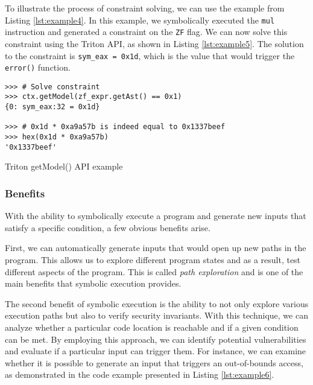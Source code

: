 To illustrate the process of constraint solving, we can use the example from Listing \ref{lst:example4}. In this example, we symbolically executed the \texttt{mul} instruction and generated a constraint on the \texttt{ZF} flag. We can now solve this constraint using the Triton API, as shown in Listing \ref{lst:example5}. The solution to the constraint is \texttt{sym\_eax = 0x1d}, which is the value that would trigger the \texttt{error()} function.

\begin{listing}[htp]
	\centering
	\begin{minipage}{.7\linewidth}
		\begin{verbatim}
>>> # Solve constraint
>>> ctx.getModel(zf_expr.getAst() == 0x1)
{0: sym_eax:32 = 0x1d}

>>> # 0x1d * 0xa9a57b is indeed equal to 0x1337beef
>>> hex(0x1d * 0xa9a57b)
'0x1337beef'
\end{verbatim}
	\end{minipage}
	\caption{Triton getModel() API example}
	\label{lst:example5}
\end{listing}

\subsubsection{Benefits}

With the ability to symbolically execute a program and generate new inputs that satisfy a specific condition, a few obvious benefits arise.

First, we can automatically generate inputs that would open up new paths in the program. This allows us to explore different program states and as a result, test different aspects of the program. This is called \textit{path exploration} and is one of the main benefits that symbolic execution provides.

The second benefit of symbolic execution is the ability to not only explore various execution paths but also to verify security invariants. With this technique, we can analyze whether a particular code location is reachable and if a given condition can be met. By employing this approach, we can identify potential vulnerabilities and evaluate if a particular input can trigger them. For instance, we can examine whether it is possible to generate an input that triggers an out-of-bounds access, as demonstrated in the code example presented in Listing \ref{lst:example6}.

